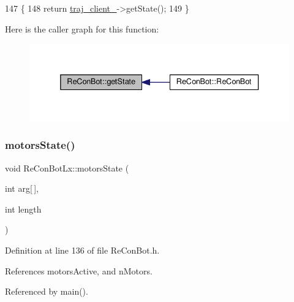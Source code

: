 \begin{DoxyCode}
147                                                  \{
148   \textcolor{keywordflow}{return} \hyperlink{class_re_con_bot_a14a35ad6ca284af7db7228d7872720d1}{traj\_client\_}->getState();
149 \}
\end{DoxyCode}
Here is the caller graph for this function\+:
\nopagebreak
\begin{figure}[H]
\begin{center}
\leavevmode
\includegraphics[width=336pt]{d9/d0b/class_re_con_bot_a3d9656755c06ded1f3b88ce05565f758_icgraph}
\end{center}
\end{figure}
\mbox{\label{class_re_con_bot_lx_a0e25f573057755c6729ea572362652e6}} 
\subsubsection{\texorpdfstring{motors\+State()}{motorsState()}}
{\footnotesize\ttfamily void Re\+Con\+Bot\+Lx\+::motors\+State (\begin{DoxyParamCaption}\item[{int}]{arg\mbox{[}$\,$\mbox{]},  }\item[{int}]{length }\end{DoxyParamCaption})\hspace{0.3cm}{\ttfamily [inherited]}}



Definition at line 136 of file Re\+Con\+Bot.\+h.



References motors\+Active, and n\+Motors.



Referenced by main().


